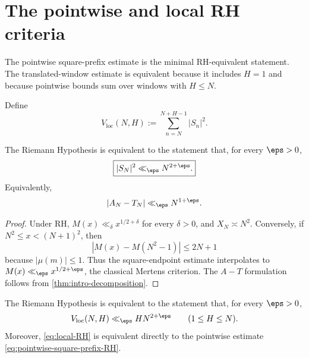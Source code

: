 \section{The pointwise and local RH criteria}
\label{sec:local-criterion}

The pointwise square-prefix estimate is the minimal RH-equivalent statement.  The translated-window estimate is equivalent because it includes $H=1$ and because pointwise bounds sum over windows with $H\le N$.

Define
\begin{equation}
 V_{\mathrm{loc}}(N,H)
 :=\sum_{n=N}^{N+H-1}|S_n|^2.
 \label{eq:Vloc}
\end{equation}

\begin{theorem}
\label{thm:pointwise-square-prefix-RH}
The Riemann Hypothesis is equivalent to the statement that, for every $\eps>0$,
\begin{equation}
 \boxed{|S_N|^2\ll_\eps N^{2+\eps}.}
 \label{eq:pointwise-square-prefix-RH}
\end{equation}
Equivalently,
\begin{equation}
 |A_N-T_N|\ll_\eps N^{1+\eps}.
 \label{eq:pointwise-AT-RH-again}
\end{equation}
\end{theorem}

\begin{proof}
Under RH, $M(x)\ll_\delta x^{1/2+\delta}$ for every $\delta>0$, and $X_N\asymp N^2$.  Conversely, if $N^2\le x<(N+1)^2$, then
\[
 |M(x)-M(N^2-1)|\le2N+1
\]
because $|\mu(m)|\le1$.  Thus the square-endpoint estimate interpolates to $M(x)\ll_\eps x^{1/2+\eps}$, the classical Mertens criterion.  The $A-T$ formulation follows from \cref{thm:intro-decomposition}.
\end{proof}

\begin{theorem}
\label{thm:local-RH}
The Riemann Hypothesis is equivalent to the statement that, for every $\eps>0$,
\begin{equation}
 V_{\mathrm{loc}}(N,H)
 \ll_\eps HN^{2+\eps}
 \qquad(1\le H\le N).
 \label{eq:local-RH}
\end{equation}
Moreover, \cref{eq:local-RH} is equivalent directly to the pointwise estimate \cref{eq:pointwise-square-prefix-RH}.
\end{theorem}

